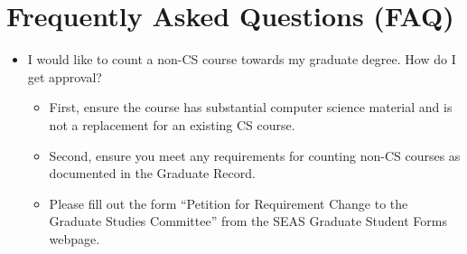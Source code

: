 \newpage

\hypertarget{appendix-faq}{
	\section{Frequently Asked Questions (FAQ)}
	\label{appendix-faq}
}

\begin{itemize}[nosep]

	\item I would like to count a non-CS course towards my graduate degree. How do I get approval?
	\begin{itemize}[nosep]
		\item First, ensure the course has substantial computer science material and is not a replacement
		      for an existing CS course.
		\item Second, ensure you meet any requirements for counting non-CS courses as documented
		      in the Graduate Record.
		\item Please fill out the form ``Petition for Requirement Change to the Graduate Studies Committee''
		      from the SEAS Graduate Student Forms webpage.
	\end{itemize}

\end{itemize}
